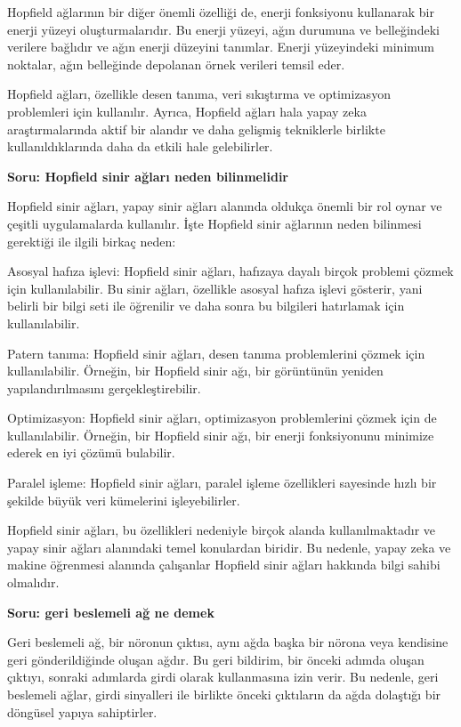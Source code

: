 \documentclass[11pt]{article}
\begin{document}
Hopfield ağlarının bir diğer önemli özelliği de, enerji fonksiyonu kullanarak bir enerji yüzeyi oluşturmalarıdır. Bu enerji yüzeyi, ağın durumuna ve belleğindeki verilere bağlıdır ve ağın enerji düzeyini tanımlar. Enerji yüzeyindeki minimum noktalar, ağın belleğinde depolanan örnek verileri temsil eder.

Hopfield ağları, özellikle desen tanıma, veri sıkıştırma ve optimizasyon problemleri için kullanılır. Ayrıca, Hopfield ağları hala yapay zeka araştırmalarında aktif bir alandır ve daha gelişmiş tekniklerle birlikte kullanıldıklarında daha da etkili hale gelebilirler.

\textbf{Soru: Hopfield sinir ağları neden bilinmelidir}

Hopfield sinir ağları, yapay sinir ağları alanında oldukça önemli bir rol oynar ve çeşitli uygulamalarda kullanılır. İşte Hopfield sinir ağlarının neden bilinmesi gerektiği ile ilgili birkaç neden:

Asosyal hafıza işlevi: Hopfield sinir ağları, hafızaya dayalı birçok problemi çözmek için kullanılabilir. Bu sinir ağları, özellikle asosyal hafıza işlevi gösterir, yani belirli bir bilgi seti ile öğrenilir ve daha sonra bu bilgileri hatırlamak için kullanılabilir.

Patern tanıma: Hopfield sinir ağları, desen tanıma problemlerini çözmek için kullanılabilir. Örneğin, bir Hopfield sinir ağı, bir görüntünün yeniden yapılandırılmasını gerçekleştirebilir.

Optimizasyon: Hopfield sinir ağları, optimizasyon problemlerini çözmek için de kullanılabilir. Örneğin, bir Hopfield sinir ağı, bir enerji fonksiyonunu minimize ederek en iyi çözümü bulabilir.

Paralel işleme: Hopfield sinir ağları, paralel işleme özellikleri sayesinde hızlı bir şekilde büyük veri kümelerini işleyebilirler.

Hopfield sinir ağları, bu özellikleri nedeniyle birçok alanda kullanılmaktadır ve yapay sinir ağları alanındaki temel konulardan biridir. Bu nedenle, yapay zeka ve makine öğrenmesi alanında çalışanlar Hopfield sinir ağları hakkında bilgi sahibi olmalıdır.

\textbf{Soru: geri beslemeli ağ ne demek}

Geri beslemeli ağ, bir nöronun çıktısı, aynı ağda başka bir nörona veya kendisine geri gönderildiğinde oluşan ağdır. Bu geri bildirim, bir önceki adımda oluşan çıktıyı, sonraki adımlarda girdi olarak kullanmasına izin verir. Bu nedenle, geri beslemeli ağlar, girdi sinyalleri ile birlikte önceki çıktıların da ağda dolaştığı bir döngüsel yapıya sahiptirler.
\end{document}
